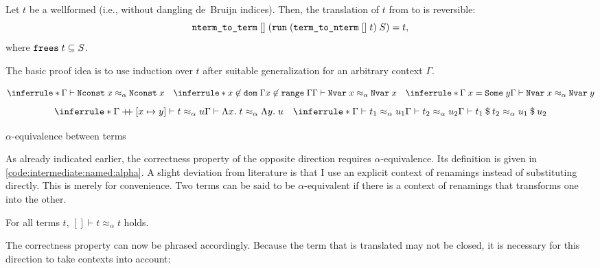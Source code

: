 \begin{lemma}
  \label{thm:intermediate:named:translate}
  Let $t$ be a wellformed  (i.e., without dangling de~Bruijn indices).
  Then, the translation of $t$ from  to  is reversible:
  \[ \texttt{\textup{nterm\_to\_term}}\;[]\;(\texttt{\textup{run}}\;(\texttt{\textup{term\_to\_nterm}}\;[]\;t)\;S) = t, \]
  where $\texttt{\textup{frees}}\;t \subseteq S$.
\end{lemma}

\noindent
The basic proof idea is to use induction over $t$ after suitable generalization for an arbitrary context $\Gamma$.

\begin{code}[t]
  \[
    \inferrule*{
    }{\Gamma \vdash \holconst{Nconst}\;x \approx_\alpha \holconst{Nconst}\;x} \quad
    \inferrule*{
      x \not\in \holconst{dom}\;\Gamma \\
      x \not\in \holconst{range}\;\Gamma
    }{\Gamma \vdash \holconst{Nvar}\;x \approx_\alpha \holconst{Nvar}\;x} \quad
    \inferrule*{
      \Gamma\;x = \holconst{Some}\;y
    }{\Gamma \vdash \holconst{Nvar}\;x \approx_\alpha \holconst{Nvar}\;y}
  \]
  \[
    \inferrule*{
      \envadd\Gamma{[ x \mapsto y ]} \vdash t \approx_\alpha u
    }{\Gamma \vdash \Lambda x.\; t \approx_\alpha \Lambda y.\; u} \quad
    \inferrule*{
      \Gamma \vdash t_1 \approx_\alpha u_1 \\
      \Gamma \vdash t_2 \approx_\alpha u_2
    }{\Gamma \vdash \app{t_1}{t_2} \approx_\alpha \app{u_1}{u_2}}
  \]
  \caption{$\alpha$-equivalence between terms}
  \label{code:intermediate:named:alpha}
\end{code}

As already indicated earlier, the correctness property of the opposite direction requires $\alpha$-equivalence.
Its definition is given in \cref{code:intermediate:named:alpha}.
A slight deviation from literature is that I use an explicit context of renamings instead of substituting directly.
This is merely for convenience.
Two terms can be said to be $\alpha$-equivalent if there is a context of renamings that transforms one into the other.

\begin{corollary}[Reflexivity]\label{thm:intermediate:named:refl}
  For all terms $t$, $[] \vdash t \approx_\alpha t$ holds.
\end{corollary}

\noindent
The correctness property can now be phrased accordingly.
Because the term that is translated may not be closed, it is necessary for this direction to take contexts into account:

